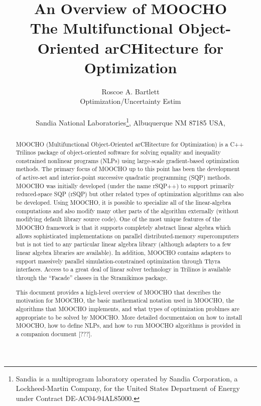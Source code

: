 \documentclass[pdf,ps2pdf,11pt]{SANDreport}
\title{
\center
An Overview of MOOCHO \\[2ex]
The Multifunctional Object-Oriented arCHitecture for Optimization
}
\author{
Roscoe A. Bartlett \\ Optimization/Uncertainty Estim \\ \\ Sandia National
Laboratories\footnote{ Sandia is a multiprogram laboratory operated by Sandia
Corporation, a Lockheed-Martin Company, for the United States Department of
Energy under Contract DE-AC04-94AL85000.}, Albuquerque NM 87185 USA, \\ }
\date{}
\begin{document}
\maketitle

%

%
\begin{abstract}
%

MOOCHO (Multifunctional Object-Oriented arCHitecture for Optimization) is a
C++ Trilinos package of object-oriented software for solving equality and
inequality constrained nonlinear programs (NLPs) using large-scale
gradient-based optimization methods.  The primary focus of MOOCHO up to this
point has been the development of active-set and interior-point successive
quadratic programming (SQP) methods.  MOOCHO was initially developed (under
the name rSQP++) to support primarily reduced-space SQP (rSQP) but other
related types of optimization algorithms can also be developed.  Using MOOCHO,
it is possible to specialize all of the linear-algebra computations and also
modify many other parts of the algorithm externally (without modifying default
library source code).  One of the most unique features of the MOOCHO framework
is that it supports completely abstract linear algebra which allows
sophisticated implementations on parallel distributed-memory supercomputers
but is not tied to any particular linear algebra library (although adapters to
a few linear algebra libraries are available).  In addition, MOOCHO contains
adapters to support massively parallel simulation-constrained optimization
through Thyra interfaces.  Access to a great deal of linear solver technology
in Trilinos is available through the ``Facade'' classes in the Stramikimos
package.

This document provides a high-level overview of MOOCHO that describes the
motivation for MOOCHO, the basic mathematical notation used in MOOCHO, the
algorithms that MOOCHO implements, and what types of optimization problmes are
appropriate to be solved by MOOCHO.  More detailed documentaion on how to
install MOOCHO, how to define NLPs, and how to run MOOCHO algorithms is
provided in a companion document [???].

%
\end{abstract}
%

%
\clearpage
\end{document}
